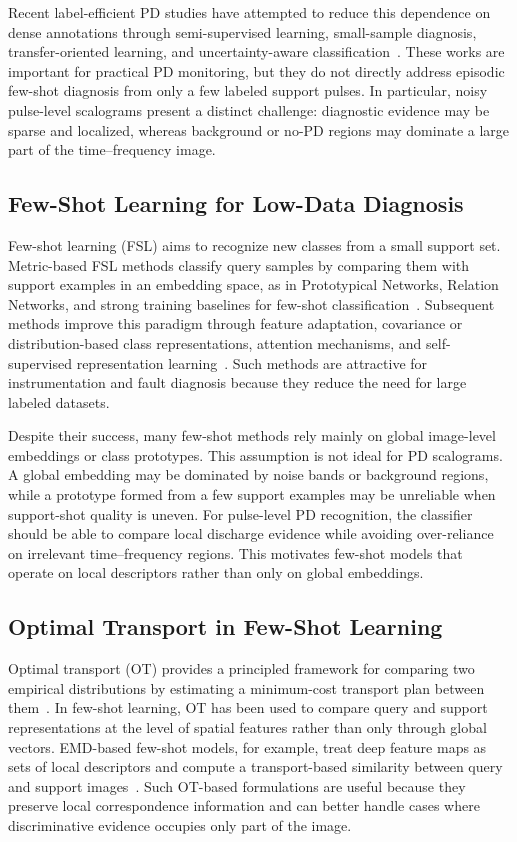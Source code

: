 \documentclass[journal]{IEEEtran}
\newcommand{\1}{\mathbf{1}}
\begin{document}
Recent label-efficient PD studies have attempted to reduce this dependence on dense annotations through semi-supervised learning, small-sample diagnosis, transfer-oriented learning, and uncertainty-aware classification~\cite{Tai2024AccessSemiSupervisedPD,Yang2025TIMSemiSupervisedPD,Jing2025MeasurementTRSMM,Sharma2025TIMBayesianPD}. These works are important for practical PD monitoring, but they do not directly address episodic few-shot diagnosis from only a few labeled support pulses. In particular, noisy pulse-level scalograms present a distinct challenge: diagnostic evidence may be sparse and localized, whereas background or no-PD regions may dominate a large part of the time--frequency image.

\subsection{Few-Shot Learning for Low-Data Diagnosis}
Few-shot learning (FSL) aims to recognize new classes from a small support set. Metric-based FSL methods classify query samples by comparing them with support examples in an embedding space, as in Prototypical Networks, Relation Networks, and strong training baselines for few-shot classification~\cite{snell2017prototypical,sung2018relation,chen2019closer}. Subsequent methods improve this paradigm through feature adaptation, covariance or distribution-based class representations, attention mechanisms, and self-supervised representation learning~\cite{ye2020few,li2019covariance,Wang2024TIMSSLFewShot,Vu2024TIMFewShotBearing}. Such methods are attractive for instrumentation and fault diagnosis because they reduce the need for large labeled datasets.

Despite their success, many few-shot methods rely mainly on global image-level embeddings or class prototypes. This assumption is not ideal for PD scalograms. A global embedding may be dominated by noise bands or background regions, while a prototype formed from a few support examples may be unreliable when support-shot quality is uneven. For pulse-level PD recognition, the classifier should be able to compare local discharge evidence while avoiding over-reliance on irrelevant time--frequency regions. This motivates few-shot models that operate on local descriptors rather than only on global embeddings.

\subsection{Optimal Transport in Few-Shot Learning}
Optimal transport (OT) provides a principled framework for comparing two empirical distributions by estimating a minimum-cost transport plan between them~\cite{Cuturi2013Sinkhorn,PeyreCuturi2019}. In few-shot learning, OT has been used to compare query and support representations at the level of spatial features rather than only through global vectors. EMD-based few-shot models, for example, treat deep feature maps as sets of local descriptors and compute a transport-based similarity between query and support images~\cite{zhang2020deepemd}. Such OT-based formulations are useful because they preserve local correspondence information and can better handle cases where discriminative evidence occupies only part of the image.
\end{document}
